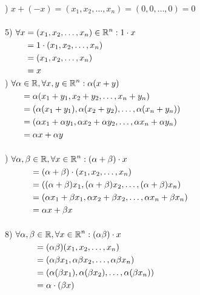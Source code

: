 \begin{example}
	) $x + (-x) = (x_1, x_2, \dots, x_n)= (0, 0, \dots, 0) = 0$ \\ 
	\\
	5) $
	\begin{aligned}[t]
			\forall x &= (x_1, x_2, \dots, x_n) \in \mathbb{R}^n: 1\cdot x\\
			&= 1 \cdot (x_1, x_2, \dots, x_n)\\
			&= (x_1, x_2, \dots, x_n) \\
			&= x
	\end{aligned}
$\\
) $
\begin{aligned}[t]
	\forall \alpha&\in\mathbb{R} , \forall x,y \in \mathbb{R}^n: \alpha (x+y)\\
	&= \alpha(x_1+y_1, x_2+y_2, \dots, x_n+y_n)\\
	&= (\alpha(x_1+y_1), \alpha(x_2+y_2), \dots, \alpha(x_n+y_n))\\
	&= (\alpha x_1+\alpha y_1, \alpha x_2+\alpha y_2, \dots, \alpha x_n+\alpha y_n)\\
	&= \alpha x + \alpha y
\end{aligned}
$\\\\
) $
\begin{aligned}[t]
	\forall \alpha, \beta &\in \mathbb{R}, \forall x\in \mathbb{R}^n: (\alpha + \beta)\cdot x\\
	&= (\alpha + \beta)\cdot (x_1, x_2, \dots, x_n)\\
	&= ((\alpha+\beta)x_1, (\alpha+\beta)x_2, \dots, (\alpha+\beta)x_n)\\
	&= (\alpha x_1 + \beta x_1, \alpha x_2 + \beta x_2, \dots , \alpha x_n + \beta x_n)\\
	&= \alpha x + \beta x
\end{aligned}
$\\
\\
8) $
\begin{aligned}[t]
		\forall \alpha, \beta &\in \mathbb{R}, \forall x\in \mathbb{R}^n: (\alpha \beta)\cdot x\\
		&= (\alpha\beta)(x_1, x_2, \dots, x_n)\\
		&= (\alpha\beta x_1, \alpha\beta x_2, \dots, \alpha\beta x_n)\\
		&= (\alpha(\beta x_1), \alpha(\beta x_2), \dots, \alpha(\beta x_n))\\
		&= \alpha \cdot (\beta x)
\end{aligned}
$
\end{example}
\newpage
{}

